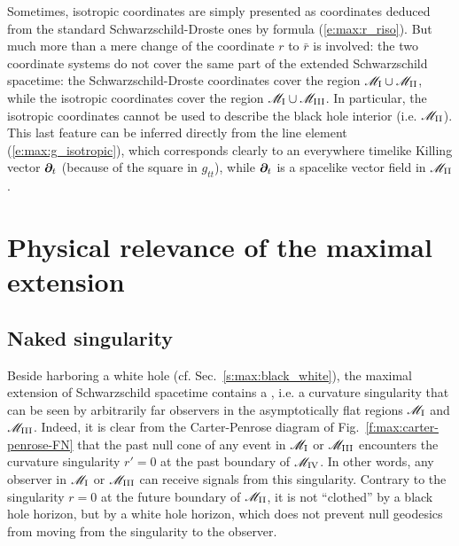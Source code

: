 \begin{remark}
Sometimes, isotropic coordinates are simply presented as
coordinates deduced from the standard Schwarzschild-Droste ones by
formula (\ref{e:max:r_riso}). But much more than a mere change
of the coordinate $r$ to $\bar{r}$ is involved:
the two coordinate systems do not cover
the same part of the extended Schwarzschild spacetime: the Schwarzschild-Droste
coordinates cover the region $\mathscr{M}_{\rm I}\cup \mathscr{M}_{\rm II}$, while the
isotropic coordinates cover the region $\mathscr{M}_{\rm I}\cup \mathscr{M}_{\rm III}$.
In particular, the isotropic coordinates cannot be used to describe the black
hole interior (i.e. $\mathscr{M}_{\rm II}$). This last feature can be inferred directly
from the line element (\ref{e:max:g_isotropic}), which corresponds clearly to
an everywhere timelike Killing vector $\bm{\partial}_t$ (because of the square in $g_{tt}$), while
$\bm{\partial}_t$ is a spacelike vector field in $\mathscr{M}_{\rm II}$.
\end{remark}


\section{Physical relevance of the maximal extension} \label{s:max:relevance}

\subsection{Naked singularity} \label{s:max:naked_sing}

Beside harboring a white hole (cf. Sec.~\ref{s:max:black_white}),
the maximal extension of Schwarzschild spacetime
contains a
,
i.e. a curvature singularity that can be seen by arbitrarily far observers
in the asymptotically flat regions $\mathscr{M}_{\rm I}$ and $\mathscr{M}_{\rm III}$.
Indeed, it is clear from
the Carter-Penrose diagram of Fig.~\ref{f:max:carter-penrose-FN} that the
past null cone of any event in $\mathscr{M}_{\rm I}$ or $\mathscr{M}_{\rm III}$ encounters the
curvature singularity $r'=0$ at the past boundary of $\mathscr{M}_{\rm IV}$. In other words,
any observer in $\mathscr{M}_{\rm I}$ or $\mathscr{M}_{\rm III}$ can receive signals from
this singularity. Contrary to the singularity $r=0$ at the future boundary of $\mathscr{M}_{\rm II}$,
it is not ``clothed'' by a black hole horizon, but by a white hole horizon, which does not prevent
null geodesics from moving from the singularity to the observer.

